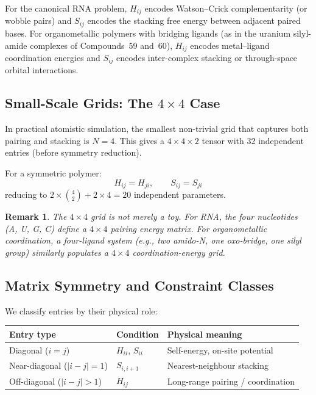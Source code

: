 \documentclass[11pt]{article}
\newtheorem{remark}{Remark}[section]
\begin{document}
For the canonical RNA problem, $H_{ij}$ encodes Watson--Crick
complementarity (or wobble pairs) and $S_{ij}$ encodes the stacking
free energy between adjacent paired bases.  For organometallic polymers
with bridging ligands (as in the uranium silyl-amide complexes of
Compounds~59 and~60), $H_{ij}$ encodes metal--ligand coordination
energies and $S_{ij}$ encodes inter-complex stacking or through-space
orbital interactions.

\subsection{Small-Scale Grids: The $4 \times 4$ Case}

In practical atomistic simulation, the smallest non-trivial grid that
captures both pairing and stacking is $N = 4$.  This gives a
$4 \times 4 \times 2$ tensor with 32 independent entries (before
symmetry reduction).

For a symmetric polymer:
\begin{equation}
  H_{ij} = H_{ji}, \qquad S_{ij} = S_{ji}
\end{equation}
reducing to $2 \times \binom{4}{2} + 2 \times 4 = 20$ independent
parameters.

\begin{remark}
The $4 \times 4$ grid is not merely a toy.  For RNA, the four
nucleotides (A, U, G, C) define a $4 \times 4$ pairing energy matrix.
For organometallic coordination, a four-ligand system (e.g., two
amido-N, one oxo-bridge, one silyl group) similarly populates a
$4 \times 4$ coordination-energy grid.
\end{remark}

\subsection{Matrix Symmetry and Constraint Classes}

We classify entries by their physical role:

\begin{center}
\begin{tabular}{lll}
\toprule
\textbf{Entry type} & \textbf{Condition} & \textbf{Physical meaning} \\
\midrule
Diagonal ($i = j$)  & $H_{ii}$, $S_{ii}$ & Self-energy, on-site potential \\
Near-diagonal ($|i-j|=1$) & $S_{i,i+1}$ & Nearest-neighbour stacking \\
Off-diagonal ($|i-j|>1$) & $H_{ij}$ & Long-range pairing / coordination \\
\bottomrule
\end{tabular}
\end{center}
\end{document}
